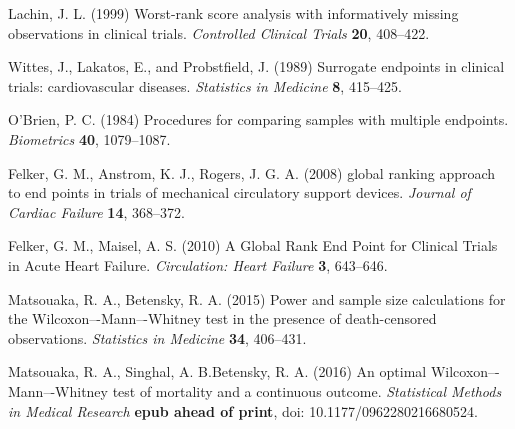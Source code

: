 \documentclass[bimj,fleqn]{w-art}\usepackage[]{graphicx}\usepackage[]{color}
\theoremstyle{plain}
\theoremstyle{definition}
\begin{document}
\begin{thebibliography}{10}

 Lachin, J. L. (1999) Worst-rank score
analysis with informatively missing observations in clinical trials.
\textit{Controlled Clinical Trials} \textbf{20}, 408--422.

Wittes, J., Lakatos, E., and Probstfield, J. (1989) Surrogate endpoints in
clinical trials: cardiovascular diseases. \textit{Statistics in Medicine}
\textbf{8}, 415--425.

 O'Brien, P. C. (1984) Procedures
for comparing samples with multiple endpoints. \textit{Biometrics}
\textbf{40}, 1079--1087.

Felker, G. M., Anstrom, K. J., Rogers, J. G. A. (2008) global ranking approach
to end points in trials of mechanical circulatory support devices.
\textit{Journal of Cardiac Failure} \textbf{14}, 368--372.

 Felker, G. M.,
Maisel, A. S. (2010) A Global Rank End Point for Clinical Trials in Acute Heart
Failure. \textit{Circulation: Heart Failure} \textbf{3}, 643--646.

Matsouaka, R. A., Betensky, R. A. (2015) Power and sample size calculations for
the Wilcoxon–-Mann–-Whitney test in the presence of death-censored observations.
\textit{Statistics in Medicine} \textbf{34}, 406--431.

Matsouaka, R. A., Singhal, A. B.Betensky, R. A. (2016) An optimal
Wilcoxon–-Mann–-Whitney test of mortality and a continuous outcome.
\textit{Statistical Methods in Medical Research}
\textbf{epub ahead of print},  doi: 10.1177/0962280216680524.


\end{thebibliography}
\phantom{aaaa}
\end{document}
